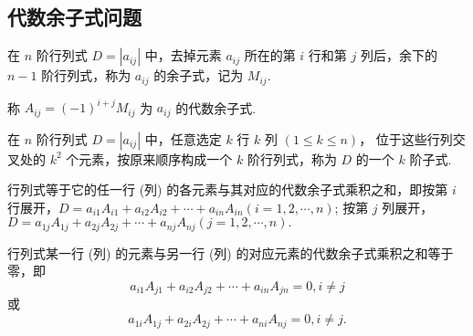 \subsection{代数余子式问题}

\begin{definition}
    在 $ n $ 阶行列式 $ D=\left|a_{i j}\right| $ 中，去掉元素 $ a_{i j} $ 所在的第 $ i $ 行和第 $ j $ 列后，余下的 $ n-1 $ 阶行列式，称为 $ a_{i j} $ 的余子式，记为 $ M_{i j} .$
\end{definition}
\begin{definition}
    称 $ A_{i j}=(-1)^{i+j} M_{i j} $ 为 $ a_{i j} $ 的代数余子式.
\end{definition}
\begin{definition}
    在 $ n $ 阶行列式 $ D=\left|a_{i j}\right| $ 中，任意选定 $ k $ 行 $ k $ 列 $ (1 \leqslant k \leqslant n) $，
    位于这些行列交叉处的 $ k^{2} $ 个元素，按原来顺序构成一个 $ k $ 阶行列式，称为 $ D $ 的一个 $ k $ 阶子式.
\end{definition}
\begin{theorem}
    行列式等于它的任一行 (列) 的各元素与其对应的代数余子式乘积之和，即按第 $ i $ 行展开，$D=a_{i 1} A_{i 1}+a_{i 2} A_{i 2}+\cdots+a_{i n} A_{i n}(i=1,2, \cdots, n) $;
    按第 $ j $ 列展开，$D=a_{1 j} A_{1 j}+a_{2 j} A_{2 j}+\cdots+a_{n j} A_{n j}(j=1,2, \cdots, n) .$
\end{theorem}
\begin{theorem}
    行列式某一行 (列) 的元素与另一行 (列) 的对应元素的代数余子式乘积之和等于零，即
    $$a_{i 1} A_{j 1}+a_{i 2} A_{j 2}+\cdots+a_{i n} A_{j n}=0, i \neq j$$
    或
    $$a_{1 i} A_{1 j}+a_{2 i} A_{2 j}+\cdots+a_{n i} A_{n j}=0, i \neq j .$$
\end{theorem}

